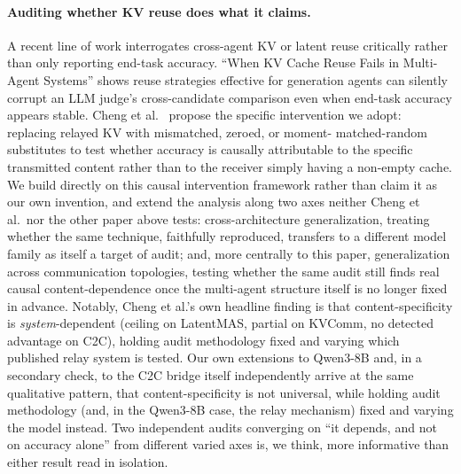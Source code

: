 \documentclass[11pt]{article}
\begin{document}
\paragraph{Auditing whether KV reuse does what it claims.} A recent line
of work interrogates cross-agent KV or latent reuse critically rather
than only reporting end-task accuracy. ``When KV Cache Reuse Fails in
Multi-Agent Systems'' \citep{kvreusefails2026} shows reuse strategies
effective for generation agents can silently corrupt an LLM judge's
cross-candidate comparison even when end-task accuracy appears stable.
Cheng et al.\ \citep{latentcommpay2026} propose the specific intervention
we adopt: replacing relayed KV with mismatched, zeroed, or moment-
matched-random substitutes to test whether accuracy is causally
attributable to the specific transmitted content rather than to the
receiver simply having a non-empty cache. We build directly on this
causal intervention framework rather than claim it as our own invention,
and extend the analysis along two axes neither Cheng et al.\ nor the
other paper above tests: cross-architecture generalization, treating
whether the same technique, faithfully reproduced, transfers to a
different model family as itself a target of audit; and, more centrally
to this paper, generalization across communication topologies, testing
whether the same audit still finds real causal content-dependence once
the multi-agent structure itself is no longer fixed in advance. Notably,
Cheng et al.'s own headline finding is that content-specificity is
\emph{system}-dependent (ceiling on LatentMAS, partial on KVComm, no
detected advantage on C2C), holding audit methodology fixed and varying
which published relay system is tested. Our own extensions to Qwen3-8B
and, in a secondary check, to the C2C bridge itself independently arrive
at the same qualitative pattern, that content-specificity is not
universal, while holding audit methodology (and, in the Qwen3-8B case,
the relay mechanism) fixed and varying the model instead. Two independent
audits converging on ``it depends, and not on accuracy alone'' from
different varied axes is, we think, more informative than either result
read in isolation.
\end{document}
